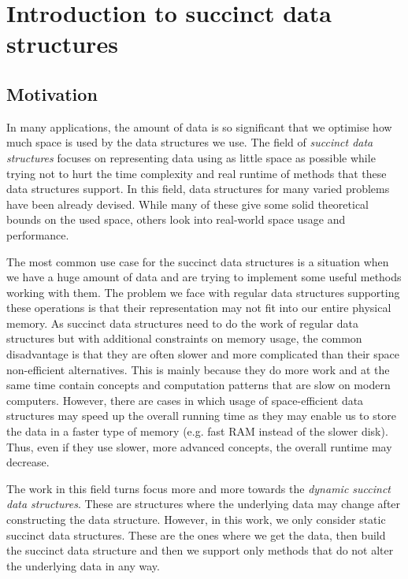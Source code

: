 \chapter{Introduction to succinct data structures}
\label{kap:kap1}

\section{Motivation}

In many applications, the amount of data is so significant that we optimise how much
space is used by the data structures we use. The field of \textit{succinct data structures}
focuses on representing data using as little space as possible while trying not to hurt
the time complexity and real runtime of methods that these data structures support. In
this field, data structures for many varied problems have been already devised. While
many of these give some solid theoretical bounds on the used space, others look into
real-world space usage and performance.

The most common use case for the succinct data structures is a situation when we
have a huge amount of data and are trying to implement some useful methods working
with them. The problem we face with regular data structures supporting these
operations is that their representation may not fit into our entire physical
memory. As succinct data structures need to do the work of regular data structures but
with additional constraints on memory usage, the common disadvantage is that
they are often slower and more complicated than their space non-efficient
alternatives. This is mainly because they do more work and at the same time contain
concepts and computation patterns that are slow on modern computers. However, there
are cases in which usage of space-efficient data structures may speed up the overall
running time as they may enable us to store the data in a faster type of memory
(e.g. fast RAM instead of the slower disk). Thus, even if they use slower, more
advanced concepts, the overall runtime may decrease.

The work in this field turns focus more and more towards the \textit{dynamic succinct
data structures}. These are structures where the underlying data may change after
constructing the data structure. However, in this work, we only consider static
succinct data structures. These are the ones where we get the data, then build
the succinct data structure and then we support only methods that do not alter the
underlying data in any way.

